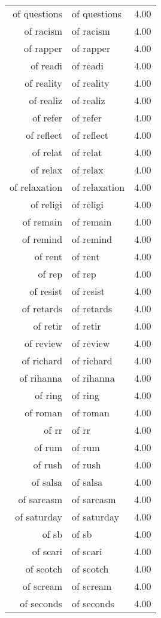 \begin{table}[ht]
\begin{tabular}{rlr}
  of questions & of questions & 4.00 \\ 
  of racism & of racism & 4.00 \\ 
  of rapper & of rapper & 4.00 \\ 
  of readi & of readi & 4.00 \\ 
  of reality & of reality & 4.00 \\ 
  of realiz & of realiz & 4.00 \\ 
  of refer & of refer & 4.00 \\ 
  of reflect & of reflect & 4.00 \\ 
  of relat & of relat & 4.00 \\ 
  of relax & of relax & 4.00 \\ 
  of relaxation & of relaxation & 4.00 \\ 
  of religi & of religi & 4.00 \\ 
  of remain & of remain & 4.00 \\ 
  of remind & of remind & 4.00 \\ 
  of rent & of rent & 4.00 \\ 
  of rep & of rep & 4.00 \\ 
  of resist & of resist & 4.00 \\ 
  of retards & of retards & 4.00 \\ 
  of retir & of retir & 4.00 \\ 
  of review & of review & 4.00 \\ 
  of richard & of richard & 4.00 \\ 
  of rihanna & of rihanna & 4.00 \\ 
  of ring & of ring & 4.00 \\ 
  of roman & of roman & 4.00 \\ 
  of rr & of rr & 4.00 \\ 
  of rum & of rum & 4.00 \\ 
  of rush & of rush & 4.00 \\ 
  of salsa & of salsa & 4.00 \\ 
  of sarcasm & of sarcasm & 4.00 \\ 
  of saturday & of saturday & 4.00 \\ 
  of sb & of sb & 4.00 \\ 
  of scari & of scari & 4.00 \\ 
  of scotch & of scotch & 4.00 \\ 
  of scream & of scream & 4.00 \\ 
  of seconds & of seconds & 4.00 \\ 

\end{tabular}
\end{table}
